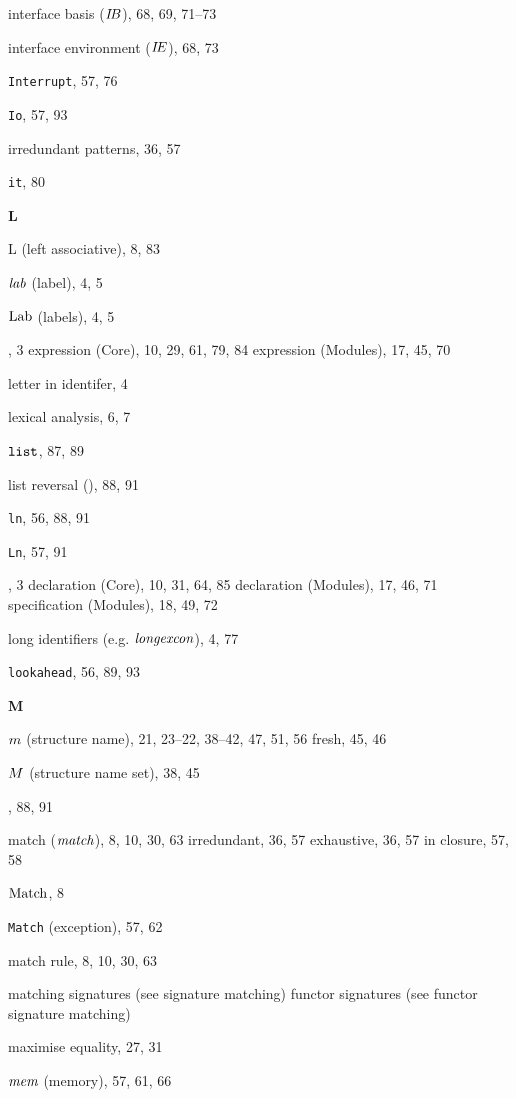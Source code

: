 \begin{theindex}
\item interface basis ($\mbox{$I\!B$}$), 68, 69, 71--73
\item interface environment ($\mbox{$I\!E$}$), 68, 73
\item {\tt Interrupt}, 57, 76
\item {\tt Io}, 57, 93
\item irredundant patterns, 36, 57
\item {\tt it}, 80
\indexspace
\parbox{65mm}{\hfil{\large\bf L}\hfil}
\indexspace
\item L (left associative), 8, 83
\item ${\it lab}$ (label), 4, 5
\item ${\rm Lab}$ (labels), 4, 5
\item \LET, 3
\subitem expression (Core), 10, 29, 61, 79, 84
\subitem expression (Modules), 17, 45, 70
\item letter in identifer, 4
\item lexical analysis, 6, 7
\item $\mbox{\tt list}$, 87, 89
\item list reversal (), 88, 91
\item {\tt ln}, 56, 88, 91
\item {\tt Ln}, 57, 91
\item \LOCAL, 3
\subitem declaration (Core), 10, 31, 64, 85
\subitem declaration (Modules), 17, 46, 71
\subitem specification (Modules), 18, 49, 72
\item long identifiers (e.g. ${\it longexcon}$), 4, 77
\item {\tt lookahead}, 56, 89, 93
\indexspace
\parbox{65mm}{\hfil{\large\bf M}\hfil}
\indexspace
\item $m$ (structure name), 21, 23--22, 38--42, 47, 51, 56
\subitem fresh, 45, 46
\item $M$ (structure name set), 38, 45
\item {}, 88, 91
\item match (${\it match}$), 8, 10, 30, 63
\subitem irredundant, 36, 57
\subitem exhaustive, 36, 57
\subitem in closure, 57, 58
\item ${\rm Match}$, 8
\item {\tt Match} (exception), 57, 62
\item match rule, 8, 10, 30, 63
\item matching 
\subitem signatures (see signature matching) 
\subitem functor signatures (see functor signature matching) 
\item maximise equality, 27, 31
\item $\mbox{\it mem}$ (memory), 57, 61, 66

\end{theindex}
